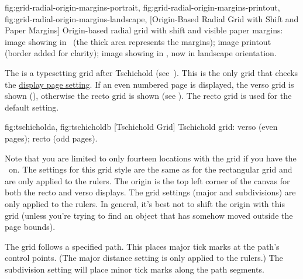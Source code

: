{
  {fig:grid-radial-origin-margins-portrait}{}{},
  {fig:grid-radial-origin-margins-printout}{}{},
  {fig:grid-radial-origin-margins-landscape}{}{},
}
[Origin-Based Radial Grid with Shift and Paper Margins]
{Origin-based radial grid with shift and visible paper margins:
 image showing in
\FlowframTk\ (the thick  area represents the margins);
 image printout
(border added for clarity);
 image showing in
\FlowframTk, now in landscape orientation.}


The  is a typesetting grid after Tschichold
(see~\cite[p.~40]{Hoschuli}). This is the only grid that checks the
\hyperref[sec:displaypage]{display page setting}. If an even
numbered page is displayed, the \gls{verso} grid is shown
(), otherwise the \gls{recto} grid is
shown (see ). The \gls*{recto} grid is
used for the default  setting.

{
  {fig:tschicholda}{}{},
  {fig:tschicholdb}{}{}
}
[Tschichold Grid]
{Tschichold grid:
 verso (even pages);
 recto (odd pages).}

Note that you are limited to only fourteen locations with the
 grid if you have the
\gridlock\ on. The settings for this grid style are the same as for
the rectangular grid and are only applied to the rulers. The \gls{origin}
is the top left corner of the \gls{canvas} for both the \gls{recto}
and \gls{verso} displays. The grid settings (major and subdivisions)
are only applied to the rulers. In general, it's best not to shift
the \gls{origin} with this grid (unless you're trying to find an
\gls{object} that has somehow moved outside the page bounds).


The  grid follows a specified path. This places major tick
marks at the path's control points. (The major distance setting is
only applied to the rulers.) The subdivision setting will place
minor tick marks along the path segments.

